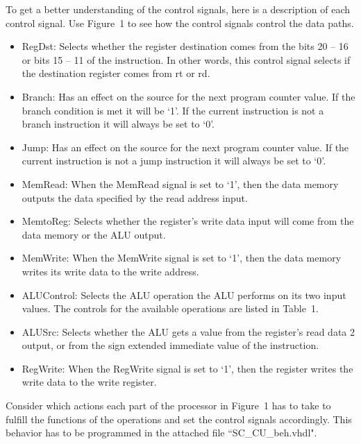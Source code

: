 \documentclass[a4paper,12pt]{article}
\begin{document}
To get a better understanding of the control signals, here is a description of each control signal. Use Figure~1 to see how the control signals control the data paths.
\begin{itemize}

	\item{RegDst: Selects whether the register destination comes from the bits 20 -- 16 or bits 15 -- 11 of the instruction. In other words, this control signal selects if the destination register comes from rt or rd.}

	\item{Branch: Has an effect on the source for the next program counter value. If the branch condition is met it will be `1'. If the current instruction is not a branch instruction it will always be set to `0'.}

	\item{Jump: Has an effect on the source for the next program counter value. If the current instruction is not a jump instruction it will always be set to `0'.}

	\item{MemRead: When the MemRead signal is set to `1', then the data memory outputs the data specified by the read address input.}

	\item{MemtoReg: Selects whether the register's write data input will come from the data memory or the ALU output.}

	\item{MemWrite: When the MemWrite signal is set to `1', then the data memory writes its write data to the write address. }

	\item{ALUControl: Selects the ALU operation the ALU performs on its two input values. The controls for the available operations are listed in Table~1.}

	\item{ALUSrc: Selects whether the ALU gets a value from the register's read data 2 output, or from the sign extended immediate value of the instruction.}

	\item{RegWrite: When the RegWrite signal is set to `1', then the register writes the write data to the write register.\\}

\end{itemize}

Consider which actions each part of the processor in Figure~1 has to take to fulfill the functions of the operations and set the control signals accordingly. This behavior has to be programmed in the attached file ``SC\_CU\_beh.vhdl".\\
\end{document}
